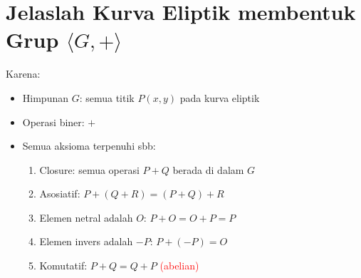 \documentclass{article}
\begin{document}

\section*{Jelaslah Kurva Eliptik membentuk Grup $\langle G, + \rangle$}

Karena:
\begin{itemize}
    \item Himpunan $G$: semua titik $P(x,y)$ pada kurva eliptik
    \item Operasi biner: $+$
    \item Semua aksioma terpenuhi sbb:
    \begin{enumerate}
        \item Closure: semua operasi $P + Q$ berada di dalam $G$
        \item Asosiatif: $P + (Q + R) = (P + Q) + R$
        \item Elemen netral adalah $O$: $P + O = O + P = P$
        \item Elemen invers adalah $-P$: $P + (-P) = O$
        \item Komutatif: $P + Q = Q + P$ \textcolor{red}{(abelian)}
    \end{enumerate}
\end{itemize}
\end{document}
